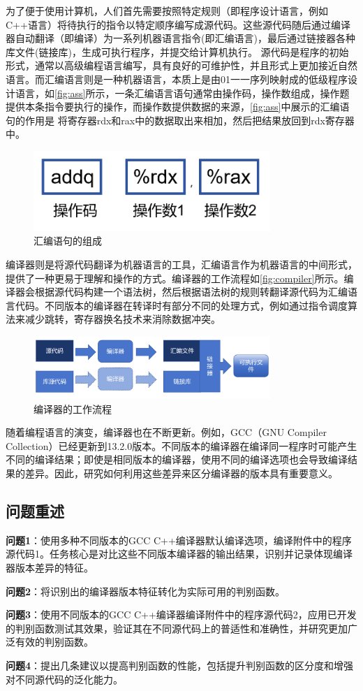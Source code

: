 \par
为了便于使用计算机，人们首先需要按照特定规则（即程序设计语言，例如C++语言）将待执行的指令以特定顺序编写成源代码。这些源代码随后通过编译器自动翻译（即编译）为一系列机器语言指令(即汇编语言)，最后通过链接器各种库文件(链接库)，生成可执行程序，并提交给计算机执行。
源代码是程序的初始形式，通常以高级编程语言编写，具有良好的可维护性，并且形式上更加接近自然语言。而汇编语言则是一种机器语言，本质上是由01一一序列映射成的低级程序设计语言，如\autoref{fig:ass}所示，一条汇编语言语句通常由操作码，操作数组成，操作题提供本条指令要执行的操作，而操作数提供数据的来源，\autoref{fig:ass}中展示的汇编语句的作用是 将寄存器rdx和rax中的数据取出来相加，然后把结果放回到rdx寄存器中。
\begin{figure}[H]
    \centering
    \includegraphics[width=0.8\textwidth]{figures/ass.png}
    \caption{汇编语句的组成}
    \label{fig:ass}
\end{figure}
编译器则是将源代码翻译为机器语言的工具，汇编语言作为机器语言的中间形式，提供了一种更易于理解和操作的方式。编译器的工作流程如\autoref{fig:compiler}所示。编译器会根据源代码构建一个语法树，然后根据语法树的规则转翻译源代码为汇编语言代码。不同版本的编译器在转译时有部分不同的处理方式，例如通过指令调度算法来减少跳转，寄存器换名技术来消除数据冲突。
\begin{figure}
    \centering
    \includegraphics[width=0.8\textwidth]{figures/compiler.png}
    \caption{编译器的工作流程}
    \label{fig:compiler}
\end{figure}
随着编程语言的演变，编译器也在不断更新。例如，GCC（GNU Compiler Collection）已经更新到13.2.0版本。不同版本的编译器在编译同一程序时可能产生不同的编译结果；即使是相同版本的编译器，使用不同的编译选项也会导致编译结果的差异。因此，研究如何利用这些差异来区分编译器的版本具有重要意义。
\par
\subsection{问题重述}
\textbf{问题1}：使用多种不同版本的GCC C++编译器默认编译选项，编译附件中的程序源代码1。任务核心是对比这些不同版本编译器的输出结果，识别并记录体现编译器版本差异的特征。

\textbf{问题2}：将识别出的编译器版本特征转化为实际可用的判别函数。

\textbf{问题3}：使用不同版本的GCC C++编译器编译附件中的程序源代码2，应用已开发的判别函数测试其效果，验证其在不同源代码上的普适性和准确性，并研究更加广泛有效的判别函数。

\textbf{问题4}：提出几条建议以提高判别函数的性能，包括提升判别函数的区分度和增强对不同源代码的泛化能力。
